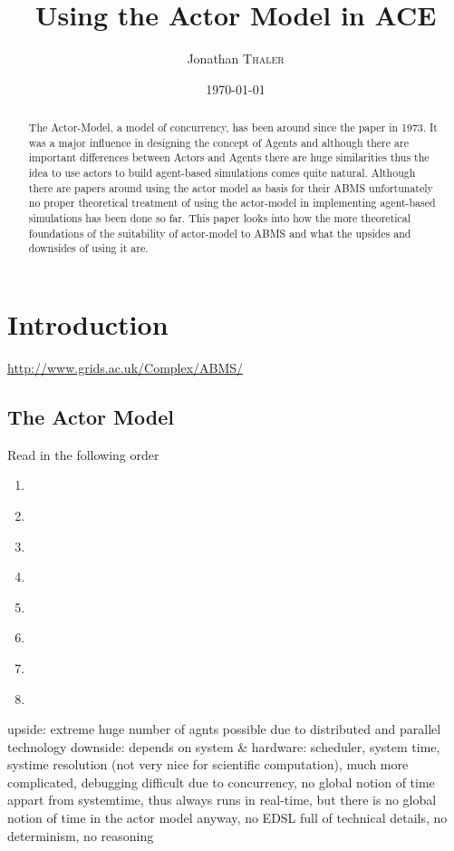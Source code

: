\documentclass{article}
\title{Using the Actor Model in ACE} %
\author{Jonathan \textsc{Thaler}}
\date{\today}
\begin{document}
\maketitle 

\begin{abstract}
The Actor-Model, a model of concurrency, has been around since the paper \cite{Hewitt_1973} in 1973. It was a major influence in designing the concept of Agents and although there are important differences between Actors and Agents there are huge similarities thus the idea to use actors to build agent-based simulations comes quite natural. Although there are papers around using the actor model as basis for their ABMS unfortunately no proper theoretical treatment of using the actor-model in implementing agent-based simulations has been done so far. This paper looks into how the more theoretical foundations of the suitability of actor-model to ABMS and what the upsides and downsides of using it are.
\end{abstract}

\section{Introduction}
\url{http://www.grids.ac.uk/Complex/ABMS/}

\subsection{The Actor Model}
Read in the following order


\begin{enumerate}
\item \cite{Hewitt_1973}
\item \cite{Greif_1975}
\item \cite{Clinger_1981}
\item \cite{Agha_1986}
\item \cite{Agha_1997}
\item \cite{Hewitt_2007}
\item \cite{Hewitt_2010}
\item \cite{Agha_2004}
\end{enumerate}

upside: extreme huge number of agnts possible due to distributed and parallel technology 
downside: depends on system \& hardware: scheduler, system time, systime resolution (not very nice for scientific computation), much more complicated, debugging difficult due to concurrency, no global notion of time appart from systemtime, thus always runs in real-time, but there is no global notion of time in the actor model anyway, no EDSL full of technical details, no determinism, no reasoning
\end{document}
